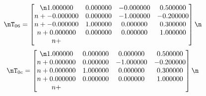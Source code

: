 \begin{equation*}\nT_{06} = \begin{bmatrix}\n1.000000 & 0.000000 & -0.000000 & 0.500000 \\n+-0.000000 & 0.000000 & -1.000000 & -0.200000 \\n+-0.000000 & 1.000000 & 0.000000 & 0.300000 \\n+0.000000 & 0.000000 & 0.000000 & 1.000000 \\n+\end{bmatrix}\n\end{equation*}\n\n\begin{equation*}\nT_{0c} = \begin{bmatrix}\n1.000000 & 0.000000 & 0.000000 & 0.500000 \\n+0.000000 & 0.000000 & -1.000000 & -0.200000 \\n+0.000000 & 1.000000 & 0.000000 & 0.300000 \\n+0.000000 & 0.000000 & 0.000000 & 1.000000 \\n+\end{bmatrix}\n\end{equation*}\n